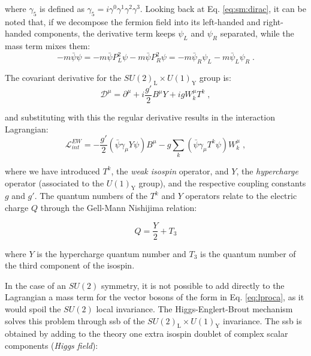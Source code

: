\noindent where $\gamma_5$ is defined as $\gamma_5 = i \gamma^0 \gamma^1 \gamma^2 \gamma^3 $. Looking back at Eq. \ref{eq:sm:dirac}, it can be noted that, if we decompose the fermion field into its left-handed and right-handed components, the derivative term keeps $\psi_L$ and $\psi_R$ separated, while the mass term mixes them:
\begin{equation}
-m \bar \psi \psi = -m \bar \psi P_L^2 \psi - m \bar \psi P_R^2 \psi
	= -m \bar \psi_R \psi_L - m \bar \psi_L \psi_R \; .
\end{equation}


\noindent The covariant derivative for the  $SU(2)_\mathrm{L} \times U(1)_\mathrm{Y}$ group is:
\begin{equation}
\mathcal{D}^{\mu} = \partial^{\mu} + i \frac{g'}{2} B^\mu Y + ig W^\mu_k T^k \; ,
\label{eq:sm:covD}
\end{equation}

\noindent and substituting with this the regular derivative results in the interaction Lagrangian:
\begin{equation}
\mathcal{L}_{int}^{EW} = -\frac{g'}{2} \left( \bar{\psi} \gamma_\mu Y \psi \right) B^\mu - g \sum_k \left( \bar{\psi} \gamma_\mu T^k \psi  \right) W_k^\mu \; ,
\end{equation}

\noindent where we have introduced $T^k$, the \textit{weak isospin} operator, and $Y$, the \textit{hypercharge} operator (associated to the $U(1)_\mathrm{Y}$ group), and the respective coupling constants $g$ and $g'$. The quantum numbers of the $T^k$ and $Y$ operators relate to the electric charge $Q$ through the  Gell-Mann Nishijima relation:

\begin{equation}
Q = \frac{Y}{2} + T_3
\label{eq:sm:Q}
\end{equation}

\noindent where $Y$ is the hypercharge quantum number and $T_3$ is the quantum number of the third component of the isospin. 

In the case of an $SU(2)$ symmetry, it is not possible to add directly to the Lagrangian a mass term for the vector bosons of the form in Eq. \ref{eq:lproca}, as it would spoil the $SU(2)$ local invariance. The Higgs-Englert-Brout mechanism \cite{Englert:1964et, Higgs:1964pj, Higgs:1964ia} solves this problem through \gls{ssb} of the $SU(2)_\mathrm{L} \times U(1)_\mathrm{Y}$ invariance. The \gls{ssb} is obtained by adding to the theory one extra isospin doublet of complex scalar components (\textit{Higgs field}):

